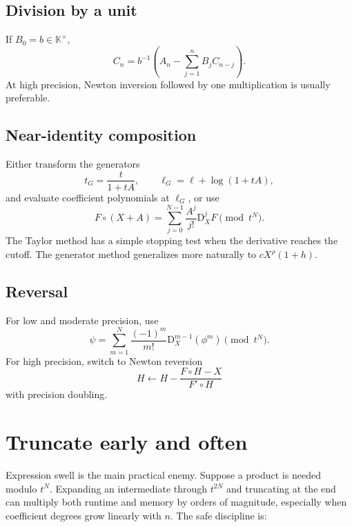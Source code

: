\documentclass[11pt,oneside,openany]{book}
\newcommand{\K}{\mathbb{K}}
\newcommand{\compose}{\mathbin{\circ}}
\newcommand{\D}{\mathrm{D}}
\begin{document}
\subsection{Division by a unit}
If \(B_0=b\in\K^\times\),
\begin{equation}\label{eq:algdivcoeff}
 C_n=b^{-1}\left(A_n-\sum_{j=1}^{n}B_jC_{n-j}\right).
\end{equation}
At high precision, Newton inversion followed by one multiplication is usually
preferable.

\subsection{Near-identity composition}
Either transform the generators
\begin{equation}\label{eq:alggenerators}
 t_G=\frac{t}{1+tA},
 \qquad
 \ell_G=\ell+\log(1+tA),
\end{equation}
and evaluate coefficient polynomials at \(\ell_G\), or use
\begin{equation}\label{eq:algtaylor}
 F\compose(X+A)=
 \sum_{j=0}^{N-1}\frac{A^j}{j!}\D_X^jF
 \pmod{t^N}.
\end{equation}
The Taylor method has a simple stopping test when the derivative reaches the
cutoff.  The generator method generalizes more naturally to
\(cX^\rho(1+h)\).

\subsection{Reversal}
For low and moderate precision, use
\begin{equation}\label{eq:algreverseLagrange}
 \psi=\sum_{m=1}^{N}
 \frac{(-1)^m}{m!}\D_X^{m-1}(\phi^m)
 \pmod{t^N}.
\end{equation}
For high precision, switch to Newton reversion
\begin{equation}\label{eq:algreverseNewton}
 H\leftarrow H-\frac{F\compose H-X}{F'\compose H}
\end{equation}
with precision doubling.

\section{Truncate early and often}
Expression swell is the main practical enemy.  Suppose a product is needed
modulo \(t^N\).  Expanding an intermediate through \(t^{2N}\) and truncating at
the end can multiply both runtime and memory by orders of magnitude, especially
when coefficient degrees grow linearly with \(n\).  The safe discipline is:
\end{document}
